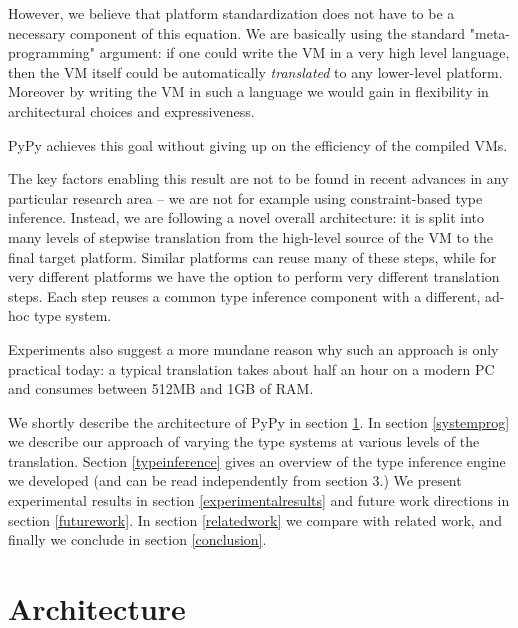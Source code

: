 \documentclass{acm_proc_article-sp}
\begin{document}
However, we believe that platform standardization does not have to be
a necessary component of this equation.  We are basically using the
standard "meta-programming" argument: if one could write the VM in a
very high level language, then the VM itself could be automatically
\textit{translated} to any lower-level platform.  Moreover by writing
the VM in such a language we would gain in flexibility in
architectural choices and expressiveness.

PyPy achieves this goal without giving up on the efficiency of the
compiled VMs.  

The key factors enabling this result are not to be found in recent
advances in any particular research area -- we are not for example using
constraint-based type inference.  Instead, we are following a novel
overall architecture: it is split into many levels of stepwise
translation from the high-level source of the VM to the final target
platform.  Similar platforms can reuse many of these steps, while for
very different platforms we have the option to perform very different
translation steps.  Each step reuses a common type inference component
with a different, ad-hoc type system.

Experiments also suggest a more mundane reason why such an approach is
only practical today: a typical translation takes about half an hour
on a modern PC and consumes between 512MB and 1GB of RAM.

We shortly describe the architecture of PyPy in section
\ref{architecture}.  In section \ref{systemprog} we describe our
approach of varying the type systems at various levels of the
translation.  Section \ref{typeinference} gives an overview of the
type inference engine we developed (and can be read independently from
section 3.)  We present experimental results in section
\ref{experimentalresults} and future work directions in section
\ref{futurework}.  In section \ref{relatedwork} we compare with
related work, and finally we conclude in section \ref{conclusion}.

\section{Architecture}
\label{architecture}
\end{document}
